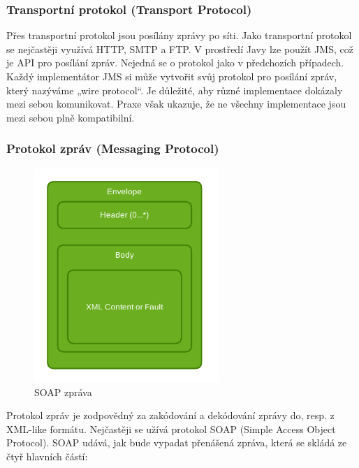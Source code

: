 \documentclass[11pt,twoside,a4paper]{book}
\begin{document}
\subsubsection{Transportní protokol (Transport Protocol)}
Přes transportní protokol jsou posílány zprávy po síti. Jako transportní protokol se nejčastěji
využívá HTTP, SMTP a FTP. V prostředí Javy lze použít JMS, což je API pro posílání zpráv.
Nejedná se o protokol jako v předchozích případech. Každý implementátor JMS si může
vytvořit svůj protokol pro posílání zpráv, který nazýváme „wire protocol“. Je důležité, aby
různé implementace dokázaly mezi sebou komunikovat. Praxe však ukazuje, že ne všechny
implementace jsou mezi sebou plně kompatibilní.

\subsubsection{Protokol zpráv (Messaging Protocol)}

\begin{figure}[h]
\begin{center}
\includegraphics[width=7cm]{images-pdf/soap.pdf} 
\caption{SOAP zpráva}
\label{fig:logo}
\end{center}
\end{figure}

Protokol zpráv je zodpovědný za zakódování a dekódování zprávy do, resp. z XML-like
formátu. Nejčastěji se užívá protokol SOAP (Simple Access Object Protocol). SOAP udává,
jak bude vypadat přenášená zpráva, která se skládá ze čtyř hlavních částí:
\end{document}
